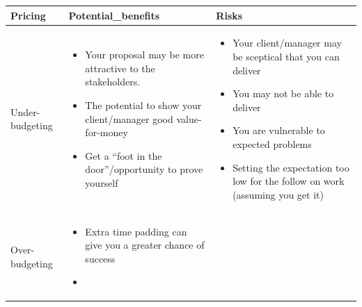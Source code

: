 \documentclass[]{book}
\providecommand{\tightlist}{%
  \setlength{\itemsep}{0pt}\setlength{\parskip}{0pt}}
\begin{document}
\begin{smaller}

\begin{longtable}[]{@{}lll@{}}
\toprule
\begin{minipage}[b]{0.22\columnwidth}\raggedright
Pricing\strut
\end{minipage} & \begin{minipage}[b]{0.35\columnwidth}\raggedright
Potential\_benefits\strut
\end{minipage} & \begin{minipage}[b]{0.35\columnwidth}\raggedright
Risks\strut
\end{minipage}\tabularnewline
\midrule
\endhead
\begin{minipage}[t]{0.22\columnwidth}\raggedright
Under-budgeting\strut
\end{minipage} & \begin{minipage}[t]{0.35\columnwidth}\raggedright
\begin{itemize}
\tightlist
\item
  Your proposal may be more attractive to the stakeholders.
\item
  The potential to show your client/manager good value-for-money
\item
  Get a ``foot in the door''/opportunity to prove yourself
\end{itemize}\strut
\end{minipage} & \begin{minipage}[t]{0.35\columnwidth}\raggedright
\begin{itemize}
\tightlist
\item
  Your client/manager may be sceptical that you can deliver
\item
  You may not be able to deliver
\item
  You are vulnerable to expected problems
\item
  Setting the expectation too low for the follow on work (assuming you
  get it)
\end{itemize}\strut
\end{minipage}\tabularnewline
\begin{minipage}[t]{0.22\columnwidth}\raggedright
Over-budgeting\strut
\end{minipage} & \begin{minipage}[t]{0.35\columnwidth}\raggedright
\begin{itemize}
\tightlist
\item
  Extra time padding can give you a greater chance of success
\item

\end{itemize}
\end{minipage}
\end{longtable}
\end{smaller}
\end{document}
